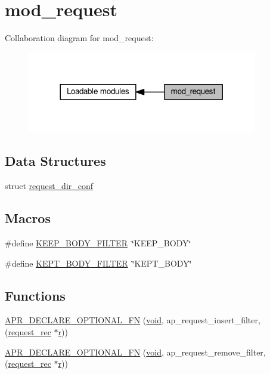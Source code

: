 \hypertarget{group__MOD__REQUEST}{}\section{mod\+\_\+request}
\label{group__MOD__REQUEST}
Collaboration diagram for mod\+\_\+request\+:
\nopagebreak
\begin{figure}[H]
\begin{center}
\leavevmode
\includegraphics[width=284pt]{group__MOD__REQUEST}
\end{center}
\end{figure}
\subsection*{Data Structures}
\begin{DoxyCompactItemize}
\item 
struct \hyperlink{structrequest__dir__conf}{request\+\_\+dir\+\_\+conf}
\end{DoxyCompactItemize}
\subsection*{Macros}
\begin{DoxyCompactItemize}
\item 
\#define \hyperlink{group__MOD__REQUEST_ga250b1ac1f8c71b519dcfd2c8bf62827a}{K\+E\+E\+P\+\_\+\+B\+O\+D\+Y\+\_\+\+F\+I\+L\+T\+ER}~\char`\"{}K\+E\+E\+P\+\_\+\+B\+O\+DY\char`\"{}
\item 
\#define \hyperlink{group__MOD__REQUEST_ga69b76f49ada6b0f7f3887a8bb36a3437}{K\+E\+P\+T\+\_\+\+B\+O\+D\+Y\+\_\+\+F\+I\+L\+T\+ER}~\char`\"{}K\+E\+P\+T\+\_\+\+B\+O\+DY\char`\"{}
\end{DoxyCompactItemize}
\subsection*{Functions}
\begin{DoxyCompactItemize}
\item 
\hyperlink{group__MOD__REQUEST_ga2343a103b416d6b623ee8b61f6644d3e}{A\+P\+R\+\_\+\+D\+E\+C\+L\+A\+R\+E\+\_\+\+O\+P\+T\+I\+O\+N\+A\+L\+\_\+\+FN} (\hyperlink{group__MOD__ISAPI_gacd6cdbf73df3d9eed42fa493d9b621a6}{void}, ap\+\_\+request\+\_\+insert\+\_\+filter,(\hyperlink{structrequest__rec}{request\+\_\+rec} $\ast$\hyperlink{pcregrep_8txt_a2e9e9438b26c0bb4425367a7e4f75eb3}{r}))
\item 
\hyperlink{group__MOD__REQUEST_ga6578f94db199e75896c1b03351712859}{A\+P\+R\+\_\+\+D\+E\+C\+L\+A\+R\+E\+\_\+\+O\+P\+T\+I\+O\+N\+A\+L\+\_\+\+FN} (\hyperlink{group__MOD__ISAPI_gacd6cdbf73df3d9eed42fa493d9b621a6}{void}, ap\+\_\+request\+\_\+remove\+\_\+filter,(\hyperlink{structrequest__rec}{request\+\_\+rec} $\ast$\hyperlink{pcregrep_8txt_a2e9e9438b26c0bb4425367a7e4f75eb3}{r}))
\end{DoxyCompactItemize}
